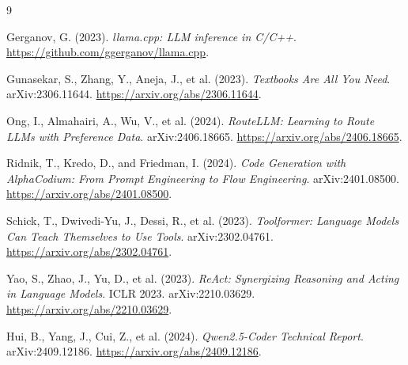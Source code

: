 \documentclass[11pt,a4paper]{article}
\begin{document}
\begin{thebibliography}{9}

Gerganov, G. (2023). \textit{llama.cpp: LLM inference in C/C++}. \url{https://github.com/ggerganov/llama.cpp}.

Gunasekar, S., Zhang, Y., Aneja, J., et al. (2023). \textit{Textbooks Are All You Need}. arXiv:2306.11644. \url{https://arxiv.org/abs/2306.11644}.

Ong, I., Almahairi, A., Wu, V., et al. (2024). \textit{RouteLLM: Learning to Route LLMs with Preference Data}. arXiv:2406.18665. \url{https://arxiv.org/abs/2406.18665}.

Ridnik, T., Kredo, D., and Friedman, I. (2024). \textit{Code Generation with AlphaCodium: From Prompt Engineering to Flow Engineering}. arXiv:2401.08500. \url{https://arxiv.org/abs/2401.08500}.

Schick, T., Dwivedi-Yu, J., Dessi, R., et al. (2023). \textit{Toolformer: Language Models Can Teach Themselves to Use Tools}. arXiv:2302.04761. \url{https://arxiv.org/abs/2302.04761}.

Yao, S., Zhao, J., Yu, D., et al. (2023). \textit{ReAct: Synergizing Reasoning and Acting in Language Models}. ICLR 2023. arXiv:2210.03629. \url{https://arxiv.org/abs/2210.03629}.

Hui, B., Yang, J., Cui, Z., et al. (2024). \textit{Qwen2.5-Coder Technical Report}. arXiv:2409.12186. \url{https://arxiv.org/abs/2409.12186}.

\end{thebibliography}
\end{document}
